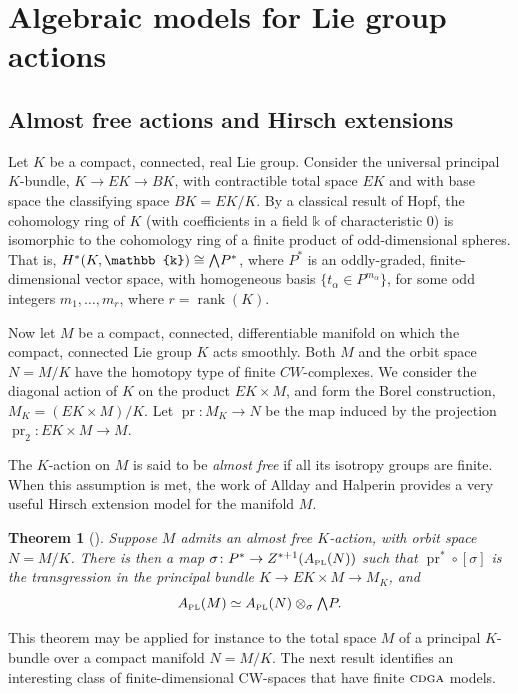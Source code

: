 \documentclass{article}
\numberwithin{equation}{section}
\newtheorem{theorem}{Theorem}[section]
\theoremstyle{definition}
\renewcommand{\k}{\mathbb{k}}
\newcommand{\cdga}{\ensuremath{\textsc{cdga}}}
\DeclareMathOperator{\rank}{rank}
\DeclareMathOperator{\proj}{pr}
\newcommand{\apl}{A_{\scriptscriptstyle{{\rm PL}}}}
\newcommand{\bwedge}{\mbox{\normalsize $\bigwedge$}}
\begin{document}
\section{Algebraic models for  Lie group actions}
\label{sect:models-act}

\subsection{Almost free actions and Hirsch extensions}
\label{subsec:s1act}

Let $K$ be a compact, connected, real Lie group. 
Consider the universal principal $K$-bundle, $K\to EK \to BK$, 
with contractible total space $EK$ and with base 
space the classifying space $BK=EK/K$.  
By a classical result of Hopf, the cohomology ring of $K$ (with 
coefficients in a field $\k$ of characteristic $0$) is isomorphic to the 
cohomology ring of a finite product of odd-dimensional spheres.  That is,
$H^{*}(K,\k) \cong \bwedge P^{*}$, 
where $P^{*}$ is an oddly-graded, finite-dimensional vector space, 
with homogeneous basis $\{ t_{\alpha} \in P^{m_{\alpha}} \}$, 
for some odd integers $m_1,\dots ,m_r$, where $r=\rank(K)$.  

Now let $M$ be a compact, connected, differentiable manifold 
on which the compact, connected Lie group $K$ acts smoothly. 
Both $M$ and the orbit space $N=M/K$ have the homotopy type 
of finite $CW$-complexes. We consider the diagonal action 
of $K$ on the product $EK\times M$, and form the Borel construction, 
$M_K=(EK\times M)/K$. Let $\proj \colon M_K \to N$ be the map induced 
by the projection $\proj_2 \colon EK \times M \to M$. 

The $K$-action on $M$ is said to be {\em almost free}\/ if all its 
isotropy groups are finite. When this assumption is met, the work of 
Allday and Halperin \cite{AH} provides a very useful 
Hirsch extension model for the manifold $M$.  

\begin{theorem}[\cite{AH}]
\label{thm:rs}
Suppose $M$ admits an almost free $K$-action, with orbit space $N=M/K$.  
There is then a map $\sigma\colon P^{*} \to Z^{* +1}(\apl (N) )$ 
such that $\proj^*\circ [\sigma]$ is the transgression in the principal bundle 
$K\to EK\times M \to M_K$, and 
\[
\apl (M) \simeq \apl (N) \otimes_{\sigma} \bwedge P .
\]
\end{theorem}

This theorem may be applied for instance to the total space $M$ 
of a principal $K$-bundle over a compact manifold $N=M/K$.
The next result identifies an interesting class of finite-dimensional 
CW-spaces that have finite $\cdga$ models. 
\end{document}
